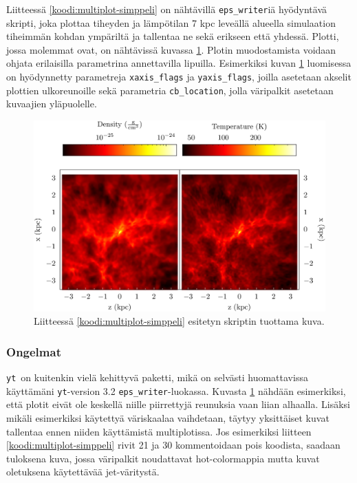 \documentclass[12pt,a4paper]{article}
\newcommand{\yt}{\texttt{yt}}
\begin{document}
Liitteessä \ref{koodi:multiplot-simppeli} on nähtävillä \texttt{eps\_writer}iä hyödyntävä skripti, joka plottaa tiheyden ja lämpötilan 7 kpc leveällä alueella simulaation tiheimmän kohdan ympäriltä ja tallentaa ne sekä erikseen että yhdessä. Plotti, jossa molemmat ovat, on nähtävissä kuvassa \ref{fig:multiplot-simppeli}. Plotin muodostamista voidaan ohjata erilaisilla parametrina annettavilla lipuilla. Esimerkiksi kuvan \ref{fig:multiplot-simppeli} luomisessa on hyödynnetty parametreja \texttt{xaxis\_flags} ja \texttt{yaxis\_flags}, joilla asetetaan akselit plottien ulkoreunoille sekä parametria \texttt{cb\_location}, jolla väripalkit asetetaan kuvaajien yläpuolelle.

\begin{figure}
   \centering
   \includegraphics[width=\textwidth]{../kuvat/EPSMultiPlot.png}
   \caption{Liitteessä \ref{koodi:multiplot-simppeli} esitetyn skriptin tuottama kuva.} \label{fig:multiplot-simppeli}
\end{figure}

\subsubsection{Ongelmat}
\yt\ on kuitenkin vielä kehittyvä paketti, mikä on selvästi huomattavissa käyttämäni \yt -version 3.2 \texttt{eps\_writer}-luokassa. Kuvasta \ref{fig:multiplot-simppeli} nähdään esimerkiksi, että plotit eivät ole keskellä niille piirrettyjä reunuksia vaan liian alhaalla. Lisäksi mikäli esimerkiksi käytettyä väriskaalaa vaihdetaan, täytyy yksittäiset kuvat tallentaa ennen niiden käyttämistä multiplotissa. Jos esimerkiksi liitteen \ref{koodi:multiplot-simppeli} rivit 21 ja 30 kommentoidaan pois koodista, saadaan tuloksena kuva, jossa väripalkit noudattavat hot-colormappia mutta kuvat oletuksena käytettävää jet-väritystä.
\end{document}
